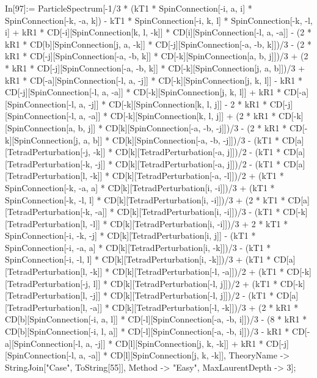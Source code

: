 In[97]:= ParticleSpectrum[-1/3 * (kT1 * SpinConnection[-i, a, i] * SpinConnection[-k, -a, k]) - kT1 * SpinConnection[-i, k, l] * SpinConnection[-k, -l, i] + kR1 * CD[-i][SpinConnection[k, l, -k]] * CD[i][SpinConnection[-l, a, -a]] - (2 * kR1 * CD[b][SpinConnection[j, a, -k]] * CD[-j][SpinConnection[-a, -b, k]])/3 - (2 * kR1 * CD[-j][SpinConnection[-a, -b, k]] * CD[-k][SpinConnection[a, b, j]])/3 + (2 * kR1 * CD[-j][SpinConnection[-a, -b, k]] * CD[-k][SpinConnection[j, a, b]])/3 + kR1 * CD[-a][SpinConnection[-l, a, -j]] * CD[-k][SpinConnection[j, k, l]] - kR1 * CD[-j][SpinConnection[-l, a, -a]] * CD[-k][SpinConnection[j, k, l]] + kR1 * CD[-a][SpinConnection[-l, a, -j]] * CD[-k][SpinConnection[k, l, j]] - 2 * kR1 * CD[-j][SpinConnection[-l, a, -a]] * CD[-k][SpinConnection[k, l, j]] + (2 * kR1 * CD[-k][SpinConnection[a, b, j]] * CD[k][SpinConnection[-a, -b, -j]])/3 - (2 * kR1 * CD[-k][SpinConnection[j, a, b]] * CD[k][SpinConnection[-a, -b, -j]])/3 - (kT1 * CD[a][TetradPerturbation[-j, -k]] * CD[k][TetradPerturbation[-a, j]])/2 - (kT1 * CD[a][TetradPerturbation[-k, -j]] * CD[k][TetradPerturbation[-a, j]])/2 - (kT1 * CD[a][TetradPerturbation[l, -k]] * CD[k][TetradPerturbation[-a, -l]])/2 + (kT1 * SpinConnection[-k, -a, a] * CD[k][TetradPerturbation[i, -i]])/3 + (kT1 * SpinConnection[-k, -l, l] * CD[k][TetradPerturbation[i, -i]])/3 + (2 * kT1 * CD[a][TetradPerturbation[-k, -a]] * CD[k][TetradPerturbation[i, -i]])/3 - (kT1 * CD[-k][TetradPerturbation[l, -l]] * CD[k][TetradPerturbation[i, -i]])/3 + 2 * kT1 * SpinConnection[-i, -k, -j] * CD[k][TetradPerturbation[i, j]] - (kT1 * SpinConnection[-i, -a, a] * CD[k][TetradPerturbation[i, -k]])/3 - (kT1 * SpinConnection[-i, -l, l] * CD[k][TetradPerturbation[i, -k]])/3 + (kT1 * CD[a][TetradPerturbation[l, -k]] * CD[k][TetradPerturbation[-l, -a]])/2 + (kT1 * CD[-k][TetradPerturbation[-j, l]] * CD[k][TetradPerturbation[-l, j]])/2 + (kT1 * CD[-k][TetradPerturbation[l, -j]] * CD[k][TetradPerturbation[-l, j]])/2 - (kT1 * CD[a][TetradPerturbation[l, -a]] * CD[k][TetradPerturbation[-l, -k]])/3 + (2 * kR1 * CD[b][SpinConnection[-i, a, l]] * CD[-l][SpinConnection[-a, -b, i]])/3 - (8 * kR1 * CD[b][SpinConnection[-i, l, a]] * CD[-l][SpinConnection[-a, -b, i]])/3 - kR1 * CD[-a][SpinConnection[-l, a, -j]] * CD[l][SpinConnection[j, k, -k]] + kR1 * CD[-j][SpinConnection[-l, a, -a]] * CD[l][SpinConnection[j, k, -k]], TheoryName -> StringJoin["Case", ToString[55]], Method -> "Easy", MaxLaurentDepth -> 3]; 